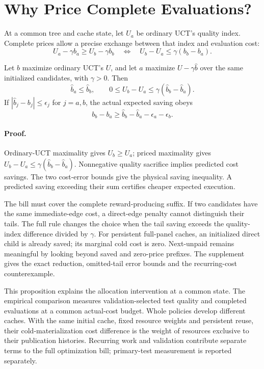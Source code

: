 \section{Why Price Complete Evaluations?}
\label{sec:finite-budget}
At a common tree and cache state, let $U_a$ be ordinary UCT's quality index.
Complete prices allow a precise exchange between that index and evaluation cost:
\begin{equation}
 U_a-\gamma b_a\ge U_b-\gamma b_b
 \quad\Longleftrightarrow\quad
 U_b-U_a\le\gamma(b_b-b_a).
 \label{eq:completion-threshold}
\end{equation}

\begin{proposition}
\label{prop:priced-tradeoff}
Let $b$ maximize ordinary UCT's $U$, and let $a$ maximize
$U-\gamma\widehat b$ over the same initialized candidates, with $\gamma>0$.
Then
\begin{equation}
 \widehat b_a\le\widehat b_b,\qquad
 0\le U_b-U_a\le\gamma(\widehat b_b-\widehat b_a).
 \label{eq:priced-tradeoff}
\end{equation}
If $|\widehat b_j-b_j|\le\epsilon_j$ for $j=a,b$, the actual expected saving obeys
\begin{equation}
 b_b-b_a\ge\widehat b_b-\widehat b_a-\epsilon_a-\epsilon_b.
 \label{eq:physical-saving}
\end{equation}
\end{proposition}

\paragraph{Proof.}
Ordinary-UCT maximality gives $U_b\ge U_a$; priced maximality gives
$U_b-U_a\le\gamma(\widehat b_b-\widehat b_a)$. Nonnegative quality sacrifice
implies predicted cost savings. The two cost-error bounds give the physical
saving inequality. A predicted saving exceeding their sum certifies cheaper
expected execution.

The bill must cover the complete reward-producing suffix. If two candidates
have the same immediate-edge cost, a direct-edge penalty cannot distinguish
their tails. The full rule changes the choice when the tail saving exceeds the
quality-index difference divided by $\gamma$. For persistent full-panel caches,
an initialized direct child is already saved; its marginal cold cost is zero.
Next-unpaid remains meaningful by looking beyond saved and zero-price prefixes.
The supplement gives the exact reduction, omitted-tail error bounds and the
recurring-cost counterexample.

This proposition explains the allocation intervention at a common state.
The empirical comparison measures validation-selected test quality and completed
evaluations at a common actual-cost budget.
Whole policies develop different caches. With the same initial cache, fixed
resource weights and persistent reuse, their cold-materialization cost difference is the weight
of resources exclusive to their publication histories. Recurring work and
validation contribute separate terms to the full optimization bill; primary-test
measurement is reported separately.
